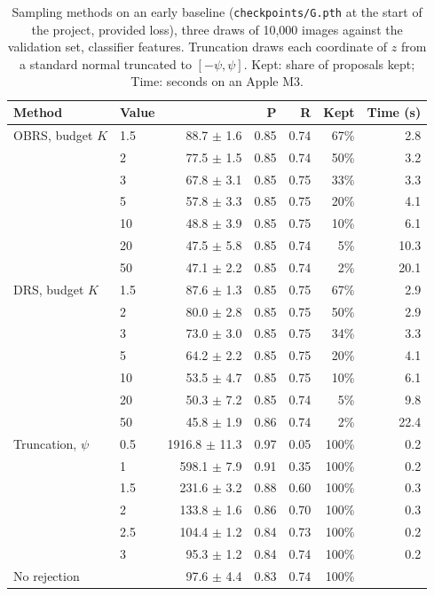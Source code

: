 \begin{table}[H]
\centering
\footnotesize
\setlength{\tabcolsep}{4pt}
\begin{tabular}{llrrrrr}
\toprule
Method & Value & \fcnn{} & P & R & Kept & Time (s) \\
\midrule
OBRS, budget $K$ & 1.5 & 88.7 $\pm$ 1.6 & 0.85 & 0.74 & 67\% & 2.8 \\
 & 2 & 77.5 $\pm$ 1.5 & 0.85 & 0.74 & 50\% & 3.2 \\
 & 3 & 67.8 $\pm$ 3.1 & 0.85 & 0.75 & 33\% & 3.3 \\
 & 5 & 57.8 $\pm$ 3.3 & 0.85 & 0.75 & 20\% & 4.1 \\
 & 10 & 48.8 $\pm$ 3.9 & 0.85 & 0.75 & 10\% & 6.1 \\
 & 20 & 47.5 $\pm$ 5.8 & 0.85 & 0.74 & 5\% & 10.3 \\
 & 50 & 47.1 $\pm$ 2.2 & 0.85 & 0.74 & 2\% & 20.1 \\
\midrule
DRS, budget $K$ & 1.5 & 87.6 $\pm$ 1.3 & 0.85 & 0.75 & 67\% & 2.9 \\
 & 2 & 80.0 $\pm$ 2.8 & 0.85 & 0.75 & 50\% & 2.9 \\
 & 3 & 73.0 $\pm$ 3.0 & 0.85 & 0.75 & 34\% & 3.3 \\
 & 5 & 64.2 $\pm$ 2.2 & 0.85 & 0.75 & 20\% & 4.1 \\
 & 10 & 53.5 $\pm$ 4.7 & 0.85 & 0.75 & 10\% & 6.1 \\
 & 20 & 50.3 $\pm$ 7.2 & 0.85 & 0.74 & 5\% & 9.8 \\
 & 50 & 45.8 $\pm$ 1.9 & 0.86 & 0.74 & 2\% & 22.4 \\
\midrule
Truncation, $\psi$ & 0.5 & 1916.8 $\pm$ 11.3 & 0.97 & 0.05 & 100\% & 0.2 \\
 & 1 & 598.1 $\pm$ 7.9 & 0.91 & 0.35 & 100\% & 0.2 \\
 & 1.5 & 231.6 $\pm$ 3.2 & 0.88 & 0.60 & 100\% & 0.3 \\
 & 2 & 133.8 $\pm$ 1.6 & 0.86 & 0.70 & 100\% & 0.3 \\
 & 2.5 & 104.4 $\pm$ 1.2 & 0.84 & 0.73 & 100\% & 0.2 \\
 & 3 & 95.3 $\pm$ 1.2 & 0.84 & 0.74 & 100\% & 0.2 \\
\midrule
No rejection &  & 97.6 $\pm$ 4.4 & 0.83 & 0.74 & 100\% &  \\
\bottomrule
\end{tabular}
\caption{Sampling methods on an early baseline (\texttt{checkpoints/G.pth} at the start of the project, provided loss), three draws of 10,000 images against the validation set, classifier features. Truncation draws each coordinate of $z$ from a standard normal truncated to $[-\psi,\psi]$. Kept: share of proposals kept; Time: seconds on an Apple M3.}
\label{tab:supp-budget}
\end{table}
